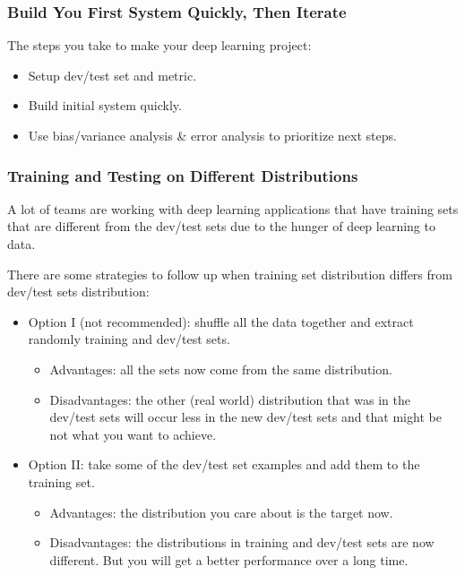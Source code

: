\subsubsection{Build You First System Quickly, Then Iterate}
The steps you take to make your deep learning project:

\begin{itemize}
    \item Setup dev/test set and metric.
    \item Build initial system quickly.
    \item Use bias/variance analysis \& error analysis to prioritize next steps.
\end{itemize}

\subsubsection{Training and Testing on Different Distributions}
A lot of teams are working with deep learning applications that have training sets that are different from the dev/test sets due to the hunger of deep learning to data.

There are some strategies to follow up when training set distribution differs from dev/test sets distribution:

\begin{itemize}
    \item Option I (not recommended): shuffle all the data together and extract randomly training and dev/test sets.
    \begin{itemize}
        \item Advantages: all the sets now come from the same distribution.
        \item Disadvantages: the other (real world) distribution that was in the dev/test sets will occur less in the new dev/test sets and that might be not what you want to achieve.
    \end{itemize}
    \item Option II: take some of the dev/test set examples and add them to the training set.
    \begin{itemize}
        \item Advantages: the distribution you care about is the target now.
        \item Disadvantages: the distributions in training and dev/test sets are now different. But you will get a better performance over a long time.
    \end{itemize}
\end{itemize}

